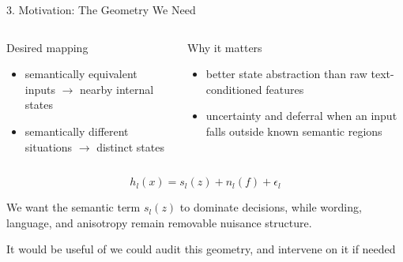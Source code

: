 \documentclass[aspectratio=169,11pt]{beamer}
\begin{document}
\begin{frame}{3. Motivation: The Geometry We Need}
  \begin{columns}[T,totalwidth=\textwidth]
      \begin{block}{Desired mapping}
      {\small
      \begin{itemize}
        \item semantically equivalent inputs \(\rightarrow\) nearby internal states
        \item semantically different situations \(\rightarrow\) distinct states
      \end{itemize}
      }
      \end{block}
      \begin{block}{Why it matters}
      {\small
      \begin{itemize}
        \item better state abstraction than raw text-conditioned features
        \item uncertainty and deferral when an input falls outside known semantic regions
      \end{itemize}
      }
      \end{block}
  \end{columns}

  \vspace{0.35cm}
  \[
  h_l(x) = s_l(z) + n_l(f) + \epsilon_l
  \]

  \vspace{0.15cm}
  {\small We want the semantic term \(s_l(z)\) to dominate decisions, while wording, language, and anisotropy remain removable nuisance structure.}
  \vspace{0.4cm}

  {\color{SignalRust}It would be useful of we could audit this geometry, and intervene on it if needed}
\end{frame}
\end{document}
